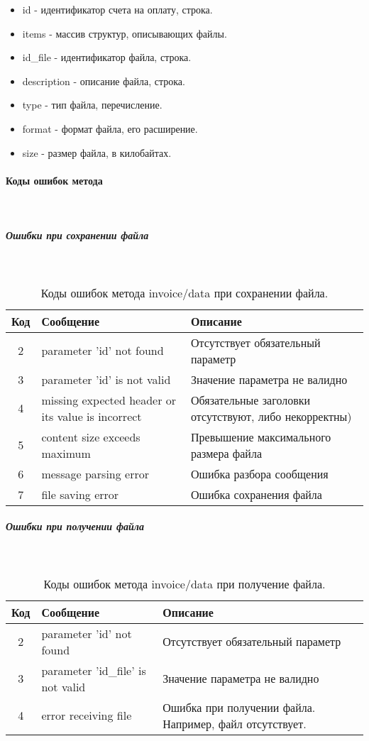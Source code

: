 \documentclass[11pt, a4paper]{article}
\begin{document}
\begin{itemize}
	\item id - идентификатор счета на оплату, строка.
	\item items - массив структур, описывающих файлы.
	\item id\_file - идентификатор файла, строка.
	\item description - описание файла, строка.
	\item type - тип файла, перечисление.
	\item format - формат файла, его расширение.
	\item size - размер файла, в килобайтах.
\end{itemize}

\paragraph{Коды ошибок метода}\

\subparagraph{Ошибки при сохранении файла}\

\begin{table}[H]
	\centering
	\begin{tabular}{| c | p{7cm} | p{8cm} |}
		\hline
		Код & Сообщение & Описание \\
		\hline
		2 & parameter 'id' not found & Отсутствует обязательный параметр \\
		3 & parameter 'id' is not valid & Значение параметра не валидно \\
		4 & missing expected header or its value is incorrect & Обязательные заголовки отсутствуют, либо некорректны) \\
		5 & content size exceeds maximum & Превышение максимального размера файла \\
		6 & message parsing error & Ошибка разбора сообщения \\
		7 & file saving error & Ошибка сохранения файла \\
		\hline
	\end{tabular}
	\caption{Коды ошибок метода invoice/data при сохранении файла.}
\end{table}

\subparagraph{Ошибки при получении файла}\
\begin{table}[H]
	\centering
	
	\begin{tabular}{| c | p{7cm} | p{8cm} |}
		\hline
		Код & Сообщение & Описание \\
		\hline
		2 & parameter 'id' not found & Отсутствует обязательный параметр \\
		3 & parameter 'id\_file' is not valid & Значение параметра не валидно \\
		4 & error receiving file & Ошибка при получении файла. Например, файл отсутствует. \\
		\hline
	\end{tabular}
	\caption{Коды ошибок метода invoice/data при получение файла.}
\end{table}
\end{document}
